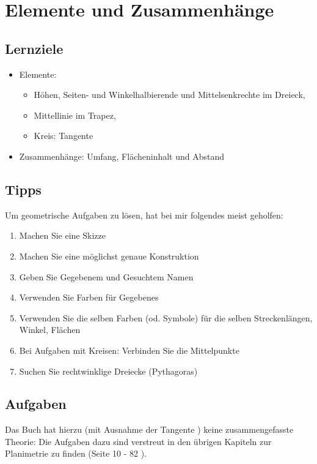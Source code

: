 
\section{Elemente und Zusammenhänge}



\subsection*{Lernziele}

\begin{itemize}
\item Elemente:
  \begin{itemize}
    \item Höhen, Seiten- und Winkelhalbierende und
      Mittelsenkrechte im Dreieck,
    \item Mittellinie im Trapez,
    \item Kreis: Tangente
      \end{itemize}
  \item Zusammenhänge: Umfang, Flächeninhalt und Abstand
\end{itemize}

\subsection{Tipps}
Um geometrische Aufgaben zu lösen, hat bei mir folgendes meist geholfen:

\begin{enumerate}
\item Machen Sie eine Skizze
\item Machen Sie eine möglichst genaue Konstruktion
\item Geben Sie Gegebenem und Gesuchtem Namen
\item Verwenden Sie Farben für Gegebenes
\item Verwenden Sie die selben Farben (od. Symbole) für die selben Streckenlängen, Winkel, Flächen
\item Bei Aufgaben mit Kreisen: Verbinden Sie die Mittelpunkte 
\item Suchen Sie rechtwinklige Dreiecke (Pythagoras)

\end{enumerate}

\subsection*{Aufgaben}
Das Buch hat hierzu (mit Ausnahme der Tangente ) keine zusammengefasste Theorie: Die Aufgaben dazu sind verstreut in den übrigen Kapiteln zur Planimetrie zu finden (Seite 10 - 82 \cite{frommenwiler18geom}).
\newpage
